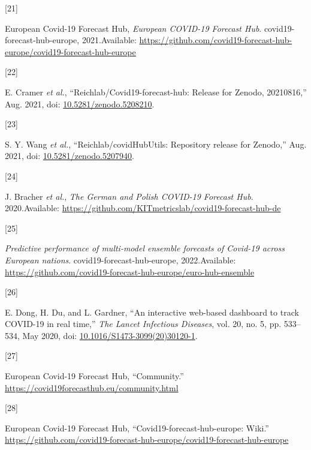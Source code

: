\documentclass[
]{article}
\newlength{\cslhangindent}
\newlength{\csllabelwidth}
\newlength{\cslentryspacingunit} %
\newenvironment{CSLReferences}[2] %
 {%
  \setlength{\parindent}{0pt}
  \ifodd #1
  \let\oldpar\par
  \def\par{\hangindent=\cslhangindent\oldpar}
  \fi
  \setlength{\parskip}{#2\cslentryspacingunit}
 }%
 {}
\newcommand{\CSLLeftMargin}[1]{\parbox[t]{\csllabelwidth}{#1}}
\newcommand{\CSLRightInline}[1]{\parbox[t]{\linewidth - \csllabelwidth}{#1}\break}
\begin{document}
\begin{CSLReferences}{0}{0}
\leavevmode{}%
\CSLLeftMargin{{[}21{]} }
\CSLRightInline{European Covid-19 Forecast Hub, \emph{European {COVID-19 Forecast Hub}}. {covid19-forecast-hub-europe}, 2021.Available: \url{https://github.com/covid19-forecast-hub-europe/covid19-forecast-hub-europe}}

\leavevmode{}%
\CSLLeftMargin{{[}22{]} }
\CSLRightInline{E. Cramer \emph{et al.}, {``Reichlab/Covid19-forecast-hub: Release for {Zenodo}, 20210816,''} Aug. 2021, doi: \href{https://doi.org/10.5281/zenodo.5208210}{10.5281/zenodo.5208210}.}

\leavevmode{}%
\CSLLeftMargin{{[}23{]} }
\CSLRightInline{S. Y. Wang \emph{et al.}, {``Reichlab/{covidHubUtils}: Repository release for {Zenodo},''} Aug. 2021, doi: \href{https://doi.org/10.5281/zenodo.5207940}{10.5281/zenodo.5207940}.}

\leavevmode{}%
\CSLLeftMargin{{[}24{]} }
\CSLRightInline{J. Bracher \emph{et al.}, \emph{The {German} and {Polish COVID-19 Forecast Hub}}. 2020.Available: \url{https://github.com/KITmetricslab/covid19-forecast-hub-de}}

\leavevmode{}%
\CSLLeftMargin{{[}25{]} }
\CSLRightInline{\emph{Predictive performance of multi-model ensemble forecasts of {Covid-19} across {European} nations}. {covid19-forecast-hub-europe}, 2022.Available: \url{https://github.com/covid19-forecast-hub-europe/euro-hub-ensemble}}

\leavevmode{}%
\CSLLeftMargin{{[}26{]} }
\CSLRightInline{E. Dong, H. Du, and L. Gardner, {``An interactive web-based dashboard to track {COVID-19} in real time,''} \emph{The Lancet Infectious Diseases}, vol. 20, no. 5, pp. 533--534, May 2020, doi: \href{https://doi.org/10.1016/S1473-3099(20)30120-1}{10.1016/S1473-3099(20)30120-1}.}

\leavevmode{}%
\CSLLeftMargin{{[}27{]} }
\CSLRightInline{European Covid-19 Forecast Hub, {``Community.''} \url{https://covid19forecasthub.eu/community.html}}

\leavevmode{}%
\CSLLeftMargin{{[}28{]} }
\CSLRightInline{European Covid-19 Forecast Hub, {``Covid19-forecast-hub-europe: {Wiki}.''} \url{https://github.com/covid19-forecast-hub-europe/covid19-forecast-hub-europe}}


\end{CSLReferences}
\end{document}
